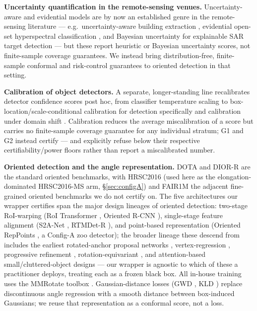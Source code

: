\documentclass[11pt]{article}
\begin{document}
\textbf{Uncertainty quantification in the remote-sensing venues.} Uncertainty-aware and evidential models are
by now an established genre in the remote-sensing literature --- e.g.\ uncertainty-aware building extraction
\citep{uanet2024}, evidential open-set hyperspectral classification \citep{ssel2024}, and Bayesian
uncertainty for explainable SAR target detection \citep{huang2023sarunc} --- but these report
heuristic or Bayesian uncertainty scores, not finite-sample coverage guarantees. We instead bring
distribution-free, finite-sample conformal and risk-control guarantees to oriented detection in that setting.

\textbf{Calibration of object detectors.} A separate, longer-standing line recalibrates detector confidence
scores post hoc, from classifier temperature scaling \citep{guo2017calibration} to box-location/scale-conditional
calibration for detection specifically \citep{kuppers2020multivariate} and calibration under domain shift
\citep{munir2022calibration}. Calibration reduces the average miscalibration of a score but carries no
finite-sample coverage guarantee for any individual stratum; G1 and G2 instead certify --- and explicitly
refuse below their respective certifiability/power floors rather than report a miscalibrated number.

\textbf{Oriented detection and the angle representation.} DOTA \citep{xia2018dota,ding2021dotabench} and
DIOR-R \citep{cheng2022diorr} are the standard oriented benchmarks, with HRSC2016 \citep{liu2017hrsc2016}
(used here as the elongation-dominated HRSC2016-MS arm, \S\ref{sec:configA}) and FAIR1M \citep{sun2022fair1m}
the adjacent fine-grained oriented benchmarks we do not certify on. The five architectures our wrapper
certifies span the major design lineages of oriented detection: two-stage RoI-warping (RoI Transformer
\citep{ding2019roitrans}, Oriented R-CNN \citep{xie2021orcnn}), single-stage feature alignment (S2A-Net
\citep{han2022s2anet}, RTMDet-R \citep{lyu2022rtmdet}), and point-based representation (Oriented RepPoints
\citep{li2022reppoints}, a Config-A zoo detector); the broader lineage these descend from includes the
earliest rotated-anchor proposal networks \citep{ma2018rrpn}, vertex-regression \citep{xu2021glidingvertex},
progressive refinement \citep{yang2021r3det}, rotation-equivariant \citep{han2021redet}, and attention-based
small/cluttered-object \citep{yang2019scrdet} designs --- our wrapper is agnostic to which of these a
practitioner deploys, treating each as a frozen black box. All in-house training uses the MMRotate toolbox
\citep{zhou2022mmrotate}. Gaussian-distance losses (GWD \citep{yang2021gwd}, KLD \citep{yang2021kld}) replace
discontinuous angle regression with a smooth distance between box-induced Gaussians; we reuse that
representation as a conformal score, not a loss.
\end{document}
